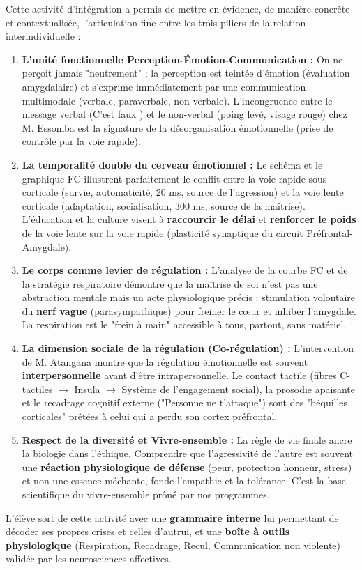 \documentclass[11pt]{article}
\newcommand{\cle}[1]{{\popxbold\color{popdark}#1}}
\newcounter{popsec}
\newcounter{popsub}
\newcommand{\courssub}[1]{%
  \stepcounter{popsub}%
  \par\vspace{9pt}\noindent{\popxbold\fontsize{11.5}{13}\selectfont\color{popink}{\color{poporange}\thepopsec.\thepopsub}\hspace{6pt}#1}\par\nopagebreak\vspace{4pt}
}
\begin{document}
\courssub{Bilan de l'activité}
Cette activité d'intégration a permis de mettre en évidence, de manière concrète et contextualisée, l'articulation fine entre les trois piliers de la relation interindividuelle :
\begin{enumerate}
    \item \textbf{L'unité fonctionnelle Perception-Émotion-Communication :} On ne perçoit jamais "neutrement" ; la perception est teintée d'émotion (évaluation amygdalaire) et s'exprime immédiatement par une communication multimodale (verbale, paraverbale, non verbale). L'incongruence entre le message verbal (\og C'est faux \fg) et le non-verbal (poing levé, visage rouge) chez M. Essomba est la signature de la \cle{désorganisation émotionnelle} (prise de contrôle par la voie rapide).
    \item \textbf{La temporalité double du cerveau émotionnel :} Le schéma et le graphique FC illustrent parfaitement le conflit entre la \cle{voie rapide sous-corticale} (survie, automaticité, 20 ms, source de l'agression) et la \cle{voie lente corticale} (adaptation, socialisation, 300 ms, source de la maîtrise). L'éducation et la culture visent à \textbf{raccourcir le délai} et \textbf{renforcer le poids} de la voie lente sur la voie rapide (plasticité synaptique du circuit Préfrontal-Amygdale).
    \item \textbf{Le corps comme levier de régulation :} L'analyse de la courbe FC et de la stratégie respiratoire démontre que la \cle{maîtrise de soi n'est pas une abstraction mentale} mais un acte physiologique précis : stimulation volontaire du \textbf{nerf vague} (parasympathique) pour freiner le cœur et inhiber l'amygdale. La respiration est le "frein à main" accessible à tous, partout, sans matériel.
    \item \textbf{La dimension sociale de la régulation (Co-régulation) :} L'intervention de M. Atangana montre que la régulation émotionnelle est souvent \textbf{interpersonnelle} avant d'être intrapersonnelle. Le contact tactile (fibres C-tactiles $\rightarrow$ Insula $\rightarrow$ Système de l'engagement social), la prosodie apaisante et le recadrage cognitif externe ("Personne ne t'attaque") sont des "béquilles corticales" prêtées à celui qui a perdu son cortex préfrontal.
    \item \textbf{Respect de la diversité et Vivre-ensemble :} La règle de vie finale ancre la biologie dans l'éthique. Comprendre que l'agressivité de l'autre est souvent une \textbf{réaction physiologique de défense} (peur, protection honneur, stress) et non une essence méchante, fonde l'\cle{empathie} et la \cle{tolérance}. C'est la base scientifique du \cle{vivre-ensemble} prôné par nos programmes.
\end{enumerate}
L'élève sort de cette activité avec une \textbf{grammaire interne} lui permettant de décoder ses propres crises et celles d'autrui, et une \textbf{boîte à outils physiologique} (Respiration, Recadrage, Recul, Communication non violente) validée par les neurosciences affectives.
\end{document}
